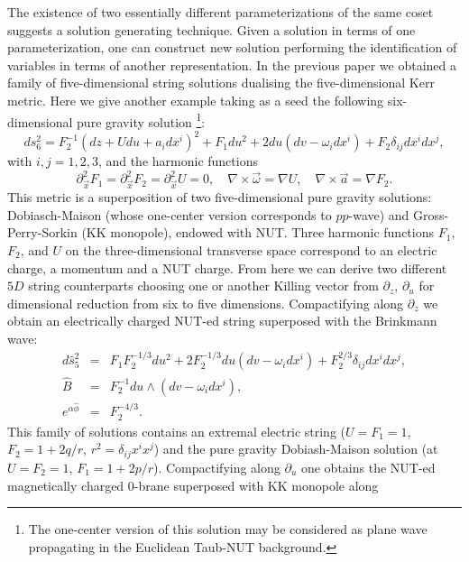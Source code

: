 \documentclass[a4paper,12pt]{article}
\begin{document}
The existence of two essentially different parameterizations of
the same coset suggests a solution generating technique. Given a
solution in terms of one parameterization, one can construct new
solution performing the identification of variables in terms of
another representation. In the previous paper \cite{ChGaMaSh99}
we obtained a family of five-dimensional string solutions
dualising the five-dimensional   Kerr metric. Here we give
another example taking as a seed the following six-dimensional
pure gravity solution \footnote{The one-center version of this
solution may be considered as plane wave propagating in the
Euclidean Taub-NUT background.}:
\begin{equation}\label{WKN}
ds_{6}^2 = F_2^{-1} ( dz + U du + a_i dx^i)^2 + F_1 du^2 + 2 du
(dv - \omega_i dx^i) + F_2 \delta_{ij} dx^i dx^j,
\end{equation}
with $i,j=1,2,3$, and the harmonic functions
\begin{equation}
\partial^2_{\vec x}F_1 = \partial^2_{\vec x}F_2
= \partial^2_{\vec x}U = 0, \quad \nabla \times \vec \omega =
\nabla U, \quad \nabla \times \vec a = \nabla F_2.
\end{equation}
This metric is a superposition of two five-dimensional pure
gravity solutions: Dobiasch-Maison \cite{DoMa82} (whose
one-center version corresponds to $pp$-wave) and
Gross-Perry-Sorkin \cite{GrPe83,So83} (KK monopole), endowed
with NUT. Three harmonic functions $F_1$, $F_2$, and $U$ on the
three-dimensional transverse space correspond to an electric
charge, a momentum and a NUT charge. From here we can derive
two different $5D$ string counterparts choosing one or another
Killing vector from $\partial_z$, $\partial_u$ for dimensional
reduction from six to five dimensions. Compactifying along
$\partial_z$ we obtain an electrically charged NUT-ed string
superposed with the Brinkmann wave:
\begin{eqnarray}
d \hat s_{5}^2 &=& F_1 F_2^{-1/3} du^2 + 2F_2^{-1/3} du (dv -
\omega_i dx^i)+ F_2^{2/3} \delta_{ij} dx^i dx^j,\\
\hat B &=& F_2^{-1} du \wedge (dv - \omega_i dx^i),\\
e^{\alpha\hat\phi} &=& F_2^{-4/3}. \label{NSW}
\end{eqnarray}
This family of solutions contains an extremal electric string
($U=F_1=1$, $F_2=1+2q/r$, $r^2=\delta_{ij}x^ix^j$) and the pure
gravity Dobiash-Maison solution (at $U=F_2=1$, $F_1=1+2p/r$).
Compactifying along $\partial_u$ one obtains the NUT-ed
magnetically charged $0$-brane superposed with KK monopole along
\end{document}
